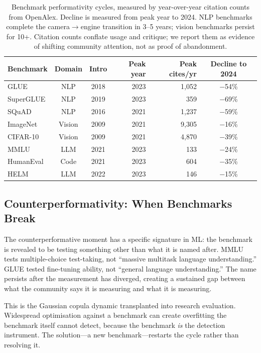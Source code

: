 \documentclass{article}
\begin{document}
\begin{table}[t]
\centering
\caption{Benchmark performativity cycles, measured by year-over-year citation counts from OpenAlex. Decline is measured from peak year to 2024. NLP benchmarks complete the camera$\to$engine transition in 3--5 years; vision benchmarks persist for 10+. Citation counts conflate usage and critique; we report them as evidence of shifting community attention, not as proof of abandonment.}
\label{tab:lifespans}
\small
\begin{tabular}{@{}lccrrc@{}}
\toprule
Benchmark & Domain & Intro & Peak year & Peak cites/yr & Decline to 2024 \\
\midrule
GLUE & NLP & 2018 & 2023 & 1{,}052 & $-$54\% \\
SuperGLUE & NLP & 2019 & 2023 & 359 & $-$69\% \\
SQuAD & NLP & 2016 & 2021 & 1{,}237 & $-$59\% \\
\midrule
ImageNet & Vision & 2009 & 2021 & 9{,}305 & $-$16\% \\
CIFAR-10 & Vision & 2009 & 2021 & 4{,}870 & $-$39\% \\
\midrule
MMLU & LLM & 2021 & 2023 & 133 & $-$24\% \\
HumanEval & Code & 2021 & 2023 & 604 & $-$35\% \\
HELM & LLM & 2022 & 2023 & 146 & $-$15\% \\
\bottomrule
\end{tabular}
\end{table}

\subsection{Counterperformativity: When Benchmarks Break}

The counterperformative moment has a specific signature in ML: the benchmark is revealed to be testing something other than what it is named after. MMLU tests multiple-choice test-taking, not ``massive multitask language understanding.'' GLUE tested fine-tuning ability, not ``general language understanding.'' The name persists after the measurement has diverged, creating a sustained gap between what the community says it is measuring and what it is measuring.

This is the Gaussian copula dynamic transplanted into research evaluation. Widespread optimisation against a benchmark can create overfitting the benchmark itself cannot detect, because the benchmark \textit{is} the detection instrument. The solution---a new benchmark---restarts the cycle rather than resolving it.
\end{document}
